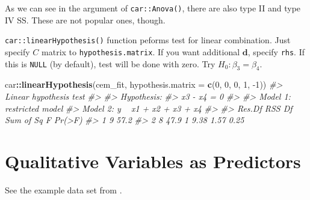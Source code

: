 \documentclass[]{book}
\newenvironment{Shaded}{\begin{snugshade}}{\end{snugshade}}
\newcommand{\CommentTok}[1]{\textcolor[rgb]{0.56,0.35,0.01}{\textit{#1}}}
\newcommand{\DataTypeTok}[1]{\textcolor[rgb]{0.13,0.29,0.53}{#1}}
\newcommand{\DecValTok}[1]{\textcolor[rgb]{0.00,0.00,0.81}{#1}}
\newcommand{\KeywordTok}[1]{\textcolor[rgb]{0.13,0.29,0.53}{\textbf{#1}}}
\newcommand{\NormalTok}[1]{#1}
\newcommand{\OperatorTok}[1]{\textcolor[rgb]{0.81,0.36,0.00}{\textbf{#1}}}
\newcommand{\StringTok}[1]{\textcolor[rgb]{0.31,0.60,0.02}{#1}}
\theoremstyle{definition}
\theoremstyle{definition}
\theoremstyle{definition}
\theoremstyle{remark}
\begin{document}
As we can see in the argument of \texttt{car::Anova()}, there are also type II and type IV SS. These are not popular ones, though.

\texttt{car::linearHypothesis()} function peforms test for linear combination. Just specify \(C\) matrix to \texttt{hypothesis.matrix}. If you want additional \(\mathbf{d}\), specify \texttt{rhs}. If this is \texttt{NULL} (by default), test will be done with zero. Try \(H_0: \beta_3 = \beta_4\).

\begin{Shaded}
\begin{Highlighting}[]
\NormalTok{car}\OperatorTok{::}\KeywordTok{linearHypothesis}\NormalTok{(cem_fit, }\DataTypeTok{hypothesis.matrix =} \KeywordTok{c}\NormalTok{(}\DecValTok{0}\NormalTok{, }\DecValTok{0}\NormalTok{, }\DecValTok{0}\NormalTok{, }\DecValTok{1}\NormalTok{, }\DecValTok{-1}\NormalTok{))}
\CommentTok{#> Linear hypothesis test}
\CommentTok{#> }
\CommentTok{#> Hypothesis:}
\CommentTok{#> x3 - x4 = 0}
\CommentTok{#> }
\CommentTok{#> Model 1: restricted model}
\CommentTok{#> Model 2: y ~ x1 + x2 + x3 + x4}
\CommentTok{#> }
\CommentTok{#>   Res.Df  RSS Df Sum of Sq    F Pr(>F)}
\CommentTok{#> 1      9 57.2                         }
\CommentTok{#> 2      8 47.9  1      9.38 1.57   0.25}
\end{Highlighting}
\end{Shaded}

\hypertarget{qualitative-variables-as-predictors}{%
\section{Qualitative Variables as Predictors}\label{qualitative-variables-as-predictors}}

See the example data set from \citet{Chatterjee:2015aa}.

\begin{Shaded}
\end{Shaded}
\end{document}
